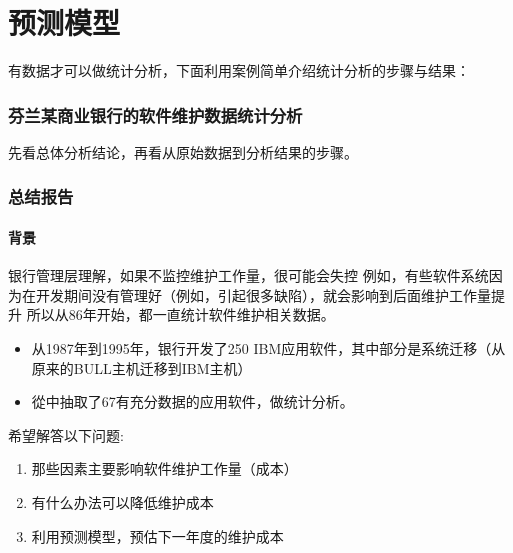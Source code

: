 \chapter{预测模型} %

有数据才可以做统计分析，下面利用案例简单介绍统计分析的步骤与结果：


\hypertarget{ux603bux7ed3ux62a5ux544a}{%
\subsection{芬兰某商业银行的软件维护数据统计分析}\label{ux603bux7ed3ux62a5ux544a}}

先看总体分析结论，再看从原始数据到分析结果的步骤。

\hypertarget{ux603bux7ed3ux62a5ux544a}{%
\subsection{总结报告}\label{ux603bux7ed3ux62a5ux544a}}

\hypertarget{ux80ccux666f}{%
\subsubsection{背景}\label{ux80ccux666f}}

银行管理层理解，如果不监控维护工作量，很可能会失控
例如，有些软件系统因为在开发期间没有管理好（例如，引起很多缺陷），就会影响到后面维护工作量提升
所以从86年开始，都一直统计软件维护相关数据。

\begin{itemize}
\tightlist
\item
  从1987年到1995年，银行开发了250
  IBM应用软件，其中部分是系统迁移（从原来的BULL主机迁移到IBM主机）
\item
  從中抽取了67有充分数据的应用软件，做统计分析。
\end{itemize}

希望解答以下问题:

\begin{enumerate}
\tightlist
\item
  那些因素主要影响软件维护工作量（成本）
\item
  有什么办法可以降低维护成本
\item
  利用预测模型，预估下一年度的维护成本
\end{enumerate}

